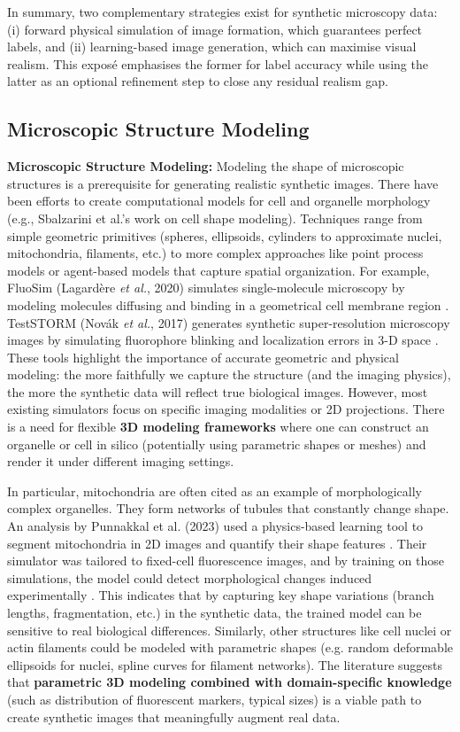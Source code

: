 \documentclass[
oneside,      %
openany       %
]{imc-inf}
\begin{document}
	In summary, two complementary strategies exist for synthetic microscopy data: (i) forward physical simulation of image formation, which guarantees perfect	labels, and (ii) learning-based image generation, which can maximise visual	realism.  This exposé emphasises the former for label accuracy while using the latter as an optional refinement step to close any residual realism gap.
	
	
	\subsection{Microscopic Structure Modeling}
	
	\textbf{Microscopic Structure Modeling:} Modeling the shape of microscopic structures is a prerequisite for generating realistic synthetic images. There have been efforts to create computational models for cell and organelle morphology (e.g., Sbalzarini et al.’s work on cell shape modeling). Techniques range from simple geometric primitives (spheres, ellipsoids, cylinders to approximate nuclei, mitochondria, filaments, etc.) to more complex approaches like point process models or agent-based models that capture spatial organization. For example, FluoSim (Lagardère \textit{et al.}, 2020) simulates single-molecule microscopy by modeling molecules diffusing and binding in a geometrical cell membrane region \cite{lagardere2020fluosim}. TestSTORM (Novák \textit{et al.}, 2017) generates synthetic super-resolution microscopy images by simulating fluorophore blinking and localization errors in 3-D space \cite{novak2017teststorm}. These tools highlight the importance of accurate geometric and physical modeling: the more faithfully we capture the structure (and the imaging physics), the more the synthetic data will reflect true biological images. However, most existing simulators focus on specific imaging modalities or 2D projections. There is a need for flexible \textbf{3D modeling frameworks} where one can construct an organelle or cell in silico (potentially using parametric shapes or meshes) and render it under different imaging settings.
	
	In particular, mitochondria are often cited as an example of morphologically complex organelles. They form networks of tubules that constantly change shape. An analysis by Punnakkal et al. (2023) used a physics-based learning tool to segment mitochondria in 2D images and quantify their shape features \cite{punnakkal2023}. Their simulator was tailored to fixed-cell fluorescence images, and by training on those simulations, the model could detect morphological changes induced experimentally \cite{punnakkal2023}. This indicates that by capturing key shape variations (branch lengths, fragmentation, etc.) in the synthetic data, the trained model can be sensitive to real biological differences. Similarly, other structures like cell nuclei or actin filaments could be modeled with parametric shapes (e.g. random deformable ellipsoids for nuclei, spline curves for filament networks). The literature suggests that \textbf{parametric 3D modeling combined with domain-specific knowledge} (such as distribution of fluorescent markers, typical sizes) is a viable path to create synthetic images that meaningfully augment real data.
	
\end{document}
